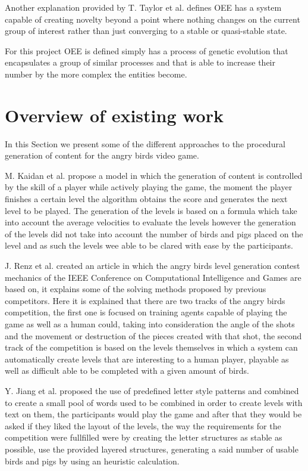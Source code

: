 \documentclass[graybox]{svmult}
\begin{document}
Another explanation provided by T. Taylor et al. \cite{Taylor2016} defines OEE has a system capable of creating novelty beyond a point where nothing changes on the current group of interest rather than just converging to a stable or quasi-stable state.

For this project OEE is defined simply has a process of genetic evolution that encapsulates a group of similar processes and that is able to increase their number by the more complex the entities become.

\section{Overview of existing work}

In this Section we present some of the different approaches to the procedural generation of content for the angry birds video game.

M. Kaidan et al. \cite{Kaidan2015} propose a model in which the generation of content is controlled by the skill of a player while actively playing the game, the moment the player finishes a certain level the algorithm obtains the score and generates the next level to be played. The generation of the levels is based on a formula which take into account the average velocities to evaluate the levels however the generation of the levels did not take into account the number of birds and pigs placed on the level and as such the levels wee able to be clared with ease by the participants. 

J. Renz et al. \cite{Renz} created an article in which the angry birds level generation contest mechanics of the IEEE Conference on Computational Intelligence and Games are based on, it explains some of the solving methods proposed by previous competitors. Here it is explained that there are two tracks of the angry birds competition, the first one is focused on training agents capable of playing the game as well as a human could, taking into consideration the angle of the shots and the movement or destruction of the pieces created with that shot, the second track of the competition is based on the levels themselves in which a system can automatically create levels that are interesting to a human player, playable as well as difficult able to be completed with a given amount of birds.

Y. Jiang et al. \cite{Jiang2017} proposed the use of predefined letter style patterns and combined to create a small pool of words used to be combined in order to create levels with text on them, the participants would play the game and after that they would be asked if they liked the layout of the levels, the way the requirements for the competition were fullfilled were by creating the letter structures as stable as possible, use the provided layered structures, generating a said number of usable birds and pigs by using an heuristic calculation.
\end{document}
